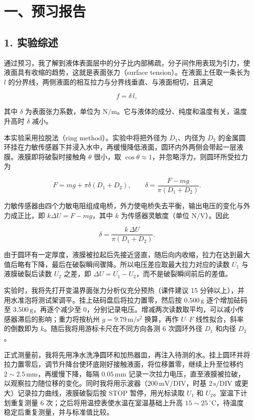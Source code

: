 \section*{一、预习报告}

\subsection*{1. 实验综述}

通过预习，我了解到液体表面层中的分子比内部稀疏，分子间作用表现为引力，使液面具有收缩的趋势，这就是表面张力（surface tension）。在液面上任取一条长为 $l$ 的分界线，两侧液面的相互拉力与分界线垂直、与液面相切，且满足

\[
f=\delta\, l,
\]

其中 $\delta$ 为表面张力系数，单位为 $\mathrm{N/m}$。它与液体的成分、纯度和温度有关，温度升高时 $\delta$ 减小。

本实验采用拉脱法（ring method）。实验中将把外径为 $D_1$、内径为 $D_2$ 的金属圆环挂在力敏传感器下并浸入水中，再缓慢降低液面，圆环内外两侧会带起一层液膜。液膜即将破裂时接触角 $\theta$ 很小，取 $\cos\theta\approx1$，并忽略浮力，则圆环所受拉力为

\[
F=mg+\pi\delta(D_1+D_2),\qquad \delta=\frac{F-mg}{\pi(D_1+D_2)}.
\]

力敏传感器由四个力敏电阻组成电桥，外力使电桥失去平衡，输出电压的变化与外力成正比，即 $k\Delta U=F-mg$，其中 $k$ 为传感器灵敏度（单位 $\mathrm{N/V}$）。因此

\[
\delta=\frac{k\,\Delta U}{\pi(D_1+D_2)}.
\]

由于圆环有一定厚度，液膜被拉起后先接近竖直，随后向内收缩，拉力在达到最大值后略有下降，最后在破裂瞬间骤降。所以电压差应取最大拉力对应的读数 $U_1$ 与液膜破裂后读数 $U_2$ 之差，即 $\Delta U=U_1-U_2$，而不是破裂瞬间前后的差值。

实验时，我将先打开变温界面张力分析仪充分预热（课件建议 15 分钟以上），并用水准泡将测试架调平。挂上砝码盘后将拉力置零，然后按 $0.500\,\mathrm{g}$ 逐个增加砝码至 $3.500\,\mathrm{g}$，再逐个减少至 $0$，分别记录电压。增减两次读数取平均，可以减小传感器滞后的影响；重力将按杭州 $g=9.79\,\mathrm{m/s^2}$ 换算，再作 $U$–$F$ 线性拟合，斜率的倒数即为 $k$。随后我将用游标卡尺在不同方向各测 6 次圆环外径 $D_1$ 和内径 $D_2$。

正式测量前，我将先用净水洗净圆环和加热器皿，再注入待测的水。挂上圆环并将拉力置零后，调节升降台使环底刚好接触液面，将位移置零，继续上升至位移约 $2\sim2.5\,\mathrm{mm}$，再缓慢下降，每隔 $0.05\,\mathrm{mm}$ 记录一次拉力电压，直至液膜被拉破，以观察拉力随位移的变化。同时我将用示波器（$200\,\mathrm{mV/DIV}$，时基 $2\,\mathrm{s/DIV}$ 或更大）记录拉力曲线，液膜破裂后按 STOP 暂停，用光标读取 $U_1$ 和 $U_2$。室温下计划重复测量 6 次；之后将用温控表使水温在室温基础上升高 $15\sim25\,{}^\circ\mathrm{C}$，待温度稳定后重复测量，并与标准值比较。


